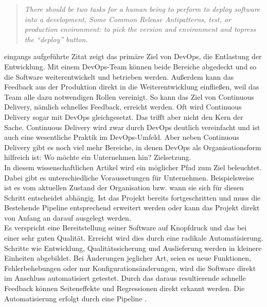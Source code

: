 \begin{quote} \textit{\glqq There should be two tasks for a human being to perform to deploy software into a development, Some Common Release Antipatterns, test, or production environment: to pick the version and environment and topress the “deploy” button. \grqq~}\cite[S.5]{Farley.2011}\\ \end{quote} 


 eingangs aufgeführte Zitat zeigt das primäre Ziel von DevOps, die Entlastung der Entwicklung. Mit einem DevOps-Team können beide Bereiche abgedeckt und so die Software weiterentwickelt und betrieben werden. Außerdem kann das Feedback aus der Produktion direkt in die Weiterentwicklung einfließen, weil das Team alle dazu notwendigen Rollen vereinigt. So kann das Ziel von Continuous Delivery, nämlich schnelles Feedback, erreicht werden. Oft wird Continuous Delivery sogar mit DevOps gleichgesetzt. Das trifft aber nicht den Kern der Sache. Continuous Delivery wird zwar durch DevOps deutlich vereinfacht und ist auch eine wesentliche Praktik im DevOps-Umfeld. Aber neben Continuous Delivery gibt es noch viel mehr Bereiche, in denen DevOps als Organisationsform hilfreich ist: Wo möchte ein Unternehmen hin? Zielsetzung. \\In diesem wissenschaftlichen Artikel wird ein möglicher Pfad zum Ziel beleuchtet. Dabei gibt es unterschiedliche Voraussetungen für Unternehmen. Beispielsweise ist es vom aktuellen Zustand der Organisation bzw. wann sie sich für diesen Schritt entscheidet abhängig. Ist das Projekt bereits fortgeschritten und muss die Bestehende Pipeline entsprechend erweitert werden oder kann das Projekt direkt von Anfang an darauf ausgelegt werden.\\
Es verspricht eine Bereitstellung seiner Software auf Knopfdruck und das bei einer sehr guten Qualität. Erreicht wird dies durch eine radikale Automatisierung. Schritte wie Entwicklung, Qualitätssicherung und Auslieferung werden in kleinere Einheiten abgebildet. Bei Änderungen jeglicher Art, seien es neue Funktionen, Fehlerbehebungen oder nur Konfigurationsänderungen, wird die Software direkt im Anschluss automatisiert getestet. Durch das daraus resultierende schnelle Feedback können Seiteneffekte und Regressionen direkt erkannt werden. Die Automatisierung erfolgt durch eine Pipeline \cite{Birk.2014}. 

